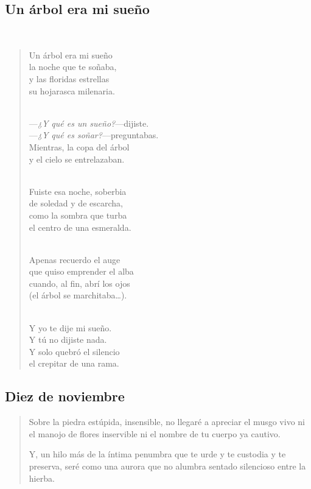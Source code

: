 \documentclass[a4paper, 12pt]{article}
\begin{document}
\pagebreak
\subsection{Un árbol era mi sueño}
~

\begin{verse}
Un árbol era mi sueño\\
la noche que te soñaba,\\
y las floridas estrellas\\
su hojarasca milenaria.\\
~ 

—\textit{¿Y qué es un sueño?}—dijiste.\\
—\textit{¿Y qué es soñar?}—preguntabas.\\
Mientras, la copa del árbol\\
y el cielo se entrelazaban.\\
~ 

Fuiste esa noche, soberbia\\
de soledad y de escarcha,\\
como la sombra que turba\\
el centro de una esmeralda.\\
~ 

Apenas recuerdo el auge\\
que quiso emprender el alba\\
cuando, al fin, abrí los ojos\\
(el árbol se marchitaba…).\\
~ 

Y yo te dije mi sueño.\\
Y tú no dijiste nada.\\
Y solo quebró el silencio\\
el crepitar de una rama.\\
\end{verse}

\pagebreak 

\subsection{Diez de noviembre}

\begin{verse}
    Sobre la piedra estúpida, insensible,
    no llegaré a apreciar el musgo vivo
    ni el manojo de flores inservible
    ni el nombre de tu cuerpo ya cautivo.

    Y, un hilo más de la íntima penumbra 
    que te urde y te custodia y te preserva, 
    seré como una aurora que no alumbra 
    sentado silencioso entre la hierba.
\end{verse}
\end{document}
